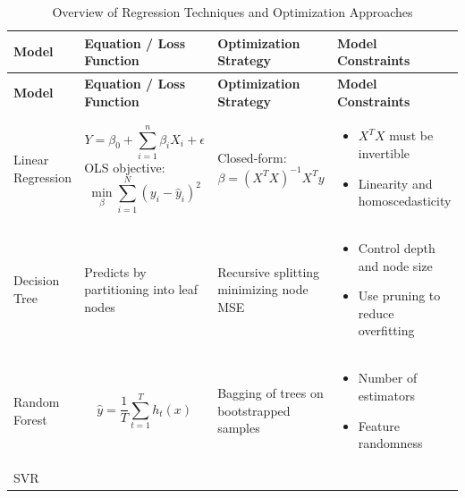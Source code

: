 \documentclass[12pt,a4paper]{article}
\begin{document}
	{\scriptsize \begin{longtable}{C{1.5cm} J{4.5cm} C{4cm} C{4cm}}
			\caption{\label{ML_table} Overview of Regression Techniques and Optimization Approaches} \\
			\hline
			\textbf{Model} & \textbf{Equation / Loss Function} & \textbf{Optimization Strategy} & \textbf{Model Constraints} \\
			\hline
			\endfirsthead
			\hline
			\textbf{Model} & \textbf{Equation / Loss Function} & \textbf{Optimization Strategy} & \textbf{Model Constraints} \\
			\hline
			\endhead
			\hline
			\endfoot
			Linear Regression & 
			\begin{equation}
				Y = \beta_0 + \sum_{i=1}^n \beta_i X_i + \epsilon
			\end{equation}
			OLS objective: 
			\begin{equation}
				\min_\beta \sum_{i=1}^N (y_i - \hat{y}_i)^2
			\end{equation}
			& Closed-form: 
			\begin{equation}
				\beta = (X^TX)^{-1}X^T y
			\end{equation} 
			& 
			\begin{itemize}
				\item $X^TX$ must be invertible
				\item Linearity and homoscedasticity
			\end{itemize} \\
			\hline
			Decision Tree & Predicts by partitioning into leaf nodes & Recursive splitting minimizing node MSE & 
			\begin{itemize}
				\item Control depth and node size
				\item Use pruning to reduce overfitting
			\end{itemize} \\
			\hline
			Random Forest & 
			\begin{equation}
				\hat{y} = \frac{1}{T} \sum_{t=1}^T h_t(x)
			\end{equation} 
			& Bagging of trees on bootstrapped samples & 
			\begin{itemize}
				\item Number of estimators
				\item Feature randomness
			\end{itemize} \\
			\hline
			SVR & 
			\begin{equation}
				\begin{split}

\end{split}
\end{equation}
\end{longtable}}
\end{document}
